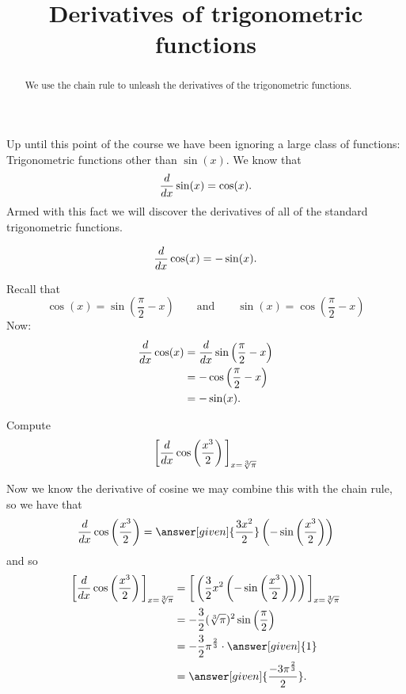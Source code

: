 \documentclass{ximera}
\title[Dig-In:]{Derivatives of trigonometric functions}
\begin{document}
\begin{abstract}
  We use the chain rule to unleash the derivatives of the
  trigonometric functions.
\end{abstract}
\maketitle


Up until this point of the course we have been ignoring a large class
of functions: Trigonometric functions other than $\sin(x)$. We know
that
\[
\frac{d}{dx} \sin(x) = \cos(x).
\]
Armed with this fact we will discover the derivatives of all of the
standard trigonometric functions.



\begin{theorem}
\[
\frac{d}{dx} \cos(x) = -\sin(x).
\]
\begin{explanation}
Recall that
\[
\cos(x) = \sin\left(\frac{\pi}{2}-x\right)\qquad\text{and}\qquad \sin(x) = \cos\left(\frac{\pi}{2}-x\right)
\]
Now:
\begin{align*}
\frac{d}{dx} \cos(x) &= \frac{d}{dx} \sin\left(\frac{\pi}{2}-x\right)\\
&=-\cos\left(\frac{\pi}{2}-x\right) \\
&= -\sin(x).
\end{align*}
\end{explanation}
\end{theorem}

\begin{example}
Compute
\[
\bigg[ \frac{d}{dx} \cos \left( \frac{x^3}{2} \right) \bigg]_{x=\sqrt[3]{\pi}}
\]
\begin{explanation}
Now we know the derivative of cosine we may combine this with the
chain rule, so we have that
\[
\ddx \cos \left( \frac{x^3}{2} \right) = \answer[given]{\frac{3 x^2}{2}} \left(- \sin \left( \frac{x^3}{2} \right) \right)
\]
and so
\begin{align*}
\eval{\ddx \cos \left( \frac{x^3}{2} \right)}_{x=\sqrt[3]{\pi}} &= \eval{\left( \frac{3}{2} x^2 \left(- \sin \left( \frac{x^3}{2} \right) \right) \right)}_{x=\sqrt[3]{\pi}}  \\
&= - \frac{3}{2} (\sqrt[3]{\pi})^2 \sin \left( \frac{\pi}{2} \right)  \\
&= - \frac{3}{2} \pi^{\frac{2}{3}} \cdot \answer[given]{1}  \\
&= \answer[given]{\frac{-3 \pi^{\frac{2}{3}}}{2}}.
\end{align*}
\end{explanation}
\end{example}
\end{document}
